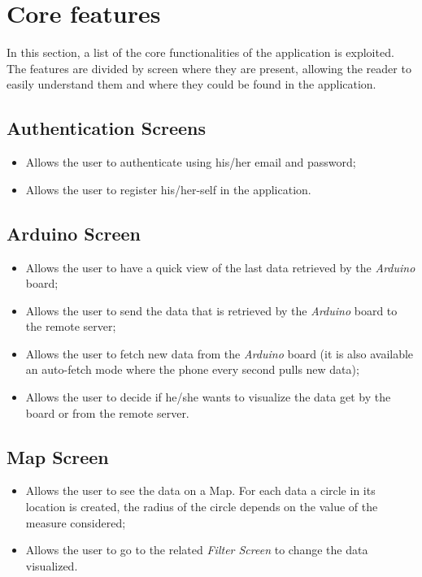 \section{Core features}
In this section, a list of the core functionalities of the application is exploited. The features are divided by screen where they are present, allowing the reader to easily understand them and where they could be found in the application.

\subsection{Authentication Screens}
\begin{itemize}
    \item Allows the user to authenticate using his/her email and password;
    \item Allows the user to register his/her-self in the application.
\end{itemize}
    
\subsection{Arduino Screen}
\begin{itemize}
    \item Allows the user to have a quick view of the last data retrieved by the \textit{Arduino} board;
    \item Allows the user to send the data that is retrieved by the \textit{Arduino} board to the remote server;
    \item Allows the user to fetch new data from the \textit{Arduino} board (it is also available an auto-fetch mode where the phone every second pulls new data);
    \item Allows the user to decide if he/she wants to visualize the data get by the board or from the remote server.
\end{itemize}
    
\subsection{Map Screen}
\begin{itemize}
    \item Allows the user to see the data on a Map. For each data a circle in its location is created, the radius of the circle depends on the value of the measure considered;
    \item Allows the user to go to the related \textit{Filter Screen} to change the data visualized.
\end{itemize}
    
